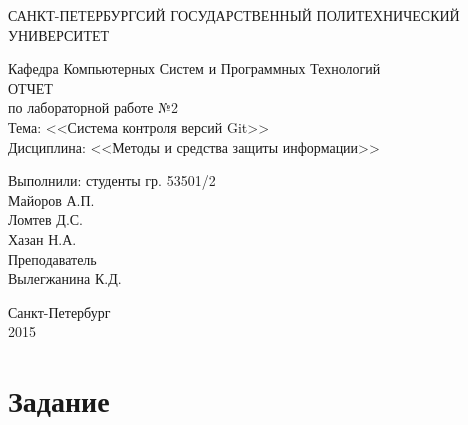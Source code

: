 \documentclass[utf8x, 12pt]{G7-32}
\begin{document}
\frontmatter 


\begin{center} 

\large САНКТ-ПЕТЕРБУРГСИЙ ГОСУДАРСТВЕННЫЙ ПОЛИТЕХНИЧЕСКИЙ УНИВЕРСИТЕТ

\large Кафедра Компьютерных Систем и Программных Технологий \\[5.5cm] 

\huge ОТЧЕТ \\[0.6cm] %
\large по лабораторной работе №2\\
\large Тема: <<Система контроля версий Git>>\\
\large Дисциплина: <<Методы и средства защиты информации>>\\[3.7cm]

\end{center} 

\begin{flushright}
Выполнили: студенты гр. 53501/2 \\
Майоров А.П. \\
Ломтев Д.С.\\
Хазан Н.А. \\[1.2cm]


Преподаватель \\
Вылегжанина К.Д.
\end{flushright}


\vfill 

\begin{center} 
\large Санкт-Петербург \\
2015
\end{center} 

\thispagestyle{empty}



\thispagestyle{empty}
\setcounter{page}{0}
\tableofcontents
\clearpage
\mainmatter


\chapter{Задание}
\end{document}
